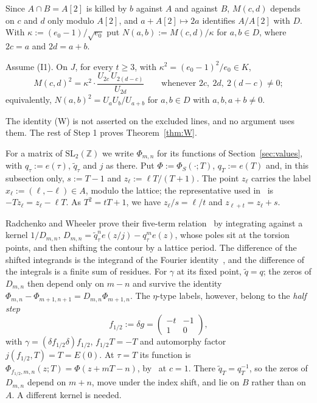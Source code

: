 \documentclass[11pt]{amsart}
\numberwithin{equation}{section}
\theoremstyle{plain}
\newenvironment{lthm}[1]{\renewcommand\thelthminner{#1}\lthminner}{\endlthminner}
\theoremstyle{definition}
\theoremstyle{remark}
\begin{document}
Since \(A\cap B=A[2]\) is killed by \(b\) against \(A\) and against \(B\), \(M(c,d)\) depends on \(c\) and \(d\) only modulo \(A[2]\), and \(a+A[2]\mapsto2a\) identifies \(A/A[2]\) with \(D\). With \(\kappa:=(e_0-1)/\sqrt{e_0}\) put \(N(a,b):=M(c,d)/\kappa\) for \(a,b\in D\), where \(2c=a\) and \(2d=a+b\).

\begin{lthm}{W}[{Model identity on \(\mathbb Z[\eta]\)}]\label{thm:W}
Assume (I1). On \(J\), for every \(t\ge3\), with \(\kappa^2=(e_0-1)^2/e_0\in K\),
\begin{equation}\tag{W}
M(c,d)^2=\kappa^2\cdot\frac{U_{2c}\,U_{2(d-c)}}{U_{2d}}\qquad\text{whenever }2c,\ 2d,\ 2(d-c)\neq0;
\end{equation}
equivalently, \(N(a,b)^2=U_aU_b/U_{a+b}\) for \(a,b\in D\) with \(a,b,a+b\ne0\).
\end{lthm}

The identity (W) is not asserted on the excluded lines, and no argument uses them. The rest of Step 1 proves Theorem~\ref{thm:W}.

For a matrix of \(\mathrm{SL}_2(\mathbb Z)\) we write \(\Phi_{m,n}\) for its functions of Section~\ref{sec:values}, with \(q_\tau:=e(\tau)\), \(\tilde q_\tau\) and \(j\) as there. Put \(\Phi:=\Phi_S(\cdot;T)\), \(q_T:=e(T)\) and, in this subsection only, \(s:=T-1\) and \(z_\ell:=\ell T/(T+1)\). The point \(z_\ell\) carries the label \(x_\ell:=(\ell,-\ell)\in A\), modulo the lattice; the representative used in~\cite{RW} is \(-Tz_\ell=z_\ell-\ell T\). As \(T^2=tT+1\), we have \(z_\ell/s=\ell/t\) and \(z_{\ell+t}=z_\ell+s\).

Radchenko and Wheeler prove their five-term relation~\cite[(7)]{RW} by integrating against a kernel \(1/D_{m,n}\), \(D_{m,n}=\tilde q_\tau^ne(z/j)-q_\tau^me(z)\), whose poles sit at the torsion points, and then shifting the contour by a lattice period. The difference of the shifted integrands is the integrand of the Fourier identity~\cite[(15)]{RW}, and the difference of the integrals is a finite sum of residues. For \(\gamma\) at its fixed point, \(\tilde q=q\); the zeros of \(D_{m,n}\) then depend only on \(m-n\) and survive the identity \(\Phi_{m,n}-\Phi_{m+1,n+1}=D_{m,n}\Phi_{m+1,n}\). The \(\eta\)-type labels, however, belong to the \emph{half step}
\[f_{1/2}:=\delta g=\begin{pmatrix}-t&-1\\1&0\end{pmatrix},\]
with \(\gamma=(\delta f_{1/2}\delta)f_{1/2}\), \(f_{1/2}T=-T\) and automorphy factor \(j(f_{1/2},T)=T=E(0)\). At \(\tau=T\) its function is \(\Phi_{f_{1/2},m,n}(z;T)=\Phi(z+mT-n)\), by~\cite[(19)]{RW} at \(c=1\). There \(\tilde q_T=q_T^{-1}\), so the zeros of \(D_{m,n}\) depend on \(m+n\), move under the index shift, and lie on \(B\) rather than on \(A\). A different kernel is needed.
\end{document}
